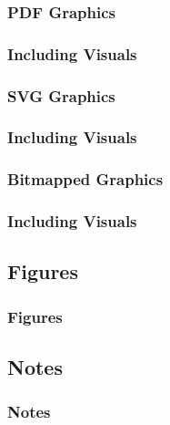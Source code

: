 {\begin{frame}[fragile]
\begin{center}
  \end{center}
\end{frame}

\subsubsection{PDF Graphics}
\begin{frame}[fragile]
  \frametitle{Including Visuals }
  \vspace{3mm}
  
\end{frame}

\subsubsection{SVG Graphics}
\begin{frame}[fragile]
  \frametitle{Including Visuals }
  \vspace{3mm}
  
\end{frame}

\subsubsection{Bitmapped Graphics}
\begin{frame}[fragile]
  \frametitle{Including Visuals }
  \vspace{3mm}
  
\end{frame}

\subsection{Figures}
\begin{frame}[fragile]
  \frametitle{Figures}
  \vspace{3mm}
  
\end{frame}

\subsection{Notes}
\begin{frame}[fragile]
  \frametitle{Notes}
  \vspace{3mm}
  

\end{frame}}
